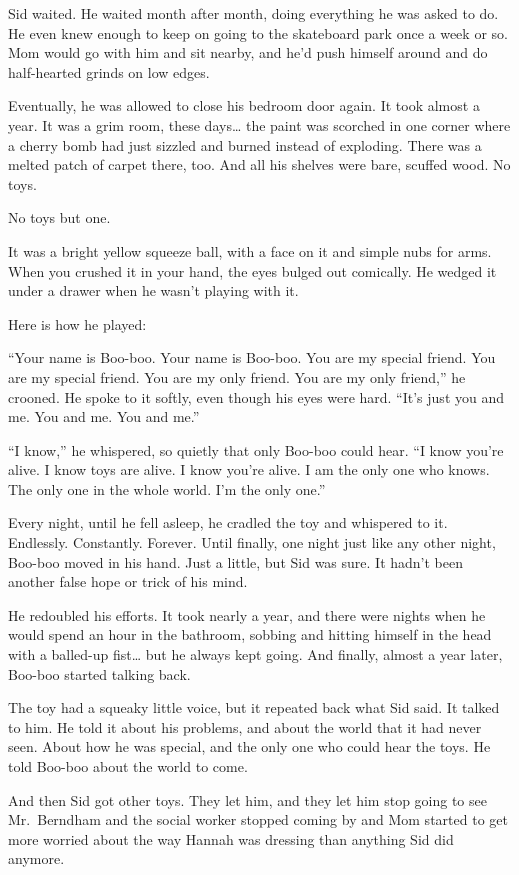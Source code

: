 Sid waited. He waited month after month, doing everything he was asked
to do. He even knew enough to keep on going to the skateboard park once
a week or so. Mom would go with him and sit nearby, and he'd push
himself around and do half-hearted grinds on low edges.

Eventually, he was allowed to close his bedroom door again. It took
almost a year. It was a grim room, these days\ldots{} the paint was
scorched in one corner where a cherry bomb had just sizzled and burned
instead of exploding. There was a melted patch of carpet there, too. And
all his shelves were bare, scuffed wood. No toys.

No toys but one.

It was a bright yellow squeeze ball, with a face on it and simple nubs
for arms. When you crushed it in your hand, the eyes bulged out
comically. He wedged it under a drawer when he wasn't playing with it.

Here is how he played:

``Your name is Boo-boo. Your name is Boo-boo. You are my special friend.
You are my special friend. You are my only friend. You are my only
friend,'' he crooned. He spoke to it softly, even though his eyes were
hard. ``It's just you and me. You and me. You and me.''

``I know,'' he whispered, so quietly that only Boo-boo could hear. ``I
know you're alive. I know toys are alive. I know you're alive. I am the
only one who knows. The only one in the whole world. I'm the only one.''

Every night, until he fell asleep, he cradled the toy and whispered to
it. Endlessly. Constantly. Forever. Until finally, one night just like
any other night, Boo-boo moved in his hand. Just a little, but Sid was
sure. It hadn't been another false hope or trick of his mind.

He redoubled his efforts. It took nearly a year, and there were nights
when he would spend an hour in the bathroom, sobbing and hitting himself
in the head with a balled-up fist\ldots{} but he always kept going. And
finally, almost a year later, Boo-boo started talking back.

The toy had a squeaky little voice, but it repeated back what Sid said.
It talked to him. He told it about his problems, and about the world
that it had never seen. About how he was special, and the only one who
could hear the toys. He told Boo-boo about the world to come.

And then Sid got other toys. They let him, and they let him stop going
to see Mr.~Berndham and the social worker stopped coming by and Mom
started to get more worried about the way Hannah was dressing than
anything Sid did anymore.

